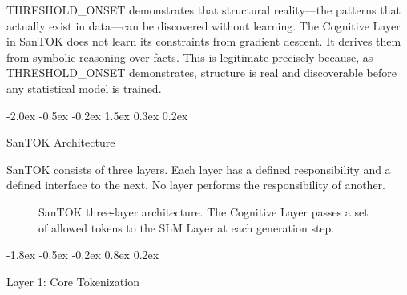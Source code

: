 \documentclass[10pt]{article}
\makeatletter
\renewcommand{\section}{\@startsection{section}{1}{\z@}%
  {-2.0ex \@plus -0.5ex \@minus -0.2ex}%
  {1.5ex \@plus 0.3ex \@minus 0.2ex}%
  {\large\bfseries\raggedright}}
\renewcommand{\subsection}{\@startsection{subsection}{2}{\z@}%
  {-1.8ex \@plus -0.5ex \@minus -0.2ex}%
  {0.8ex \@plus 0.2ex}%
  {\normalsize\bfseries\raggedright}}
\makeatother
\begin{document}
THRESHOLD\_ONSET demonstrates that structural reality---the patterns that actually exist
in data---can be discovered without learning. The Cognitive Layer in SanTOK does not
learn its constraints from gradient descent. It derives them from symbolic reasoning
over facts. This is legitimate precisely because, as THRESHOLD\_ONSET demonstrates,
structure is real and discoverable before any statistical model is trained.

\section{SanTOK Architecture}

SanTOK consists of three layers. Each layer has a defined responsibility and a defined
interface to the next. No layer performs the responsibility of another.

\begin{figure}[t]
\centering
{}
\caption{SanTOK three-layer architecture. The Cognitive Layer passes a set of
allowed tokens to the SLM Layer at each generation step.}
\label{fig:arch}
\end{figure}

\subsection{Layer 1: Core Tokenization}
\end{document}
